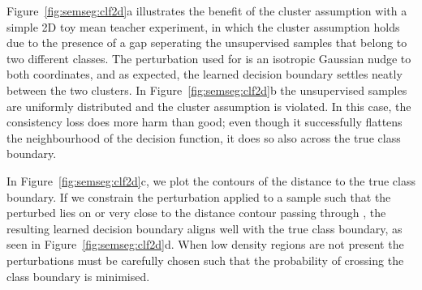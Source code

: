 \documentclass{bmvc2k}
\begin{document}
Figure~\ref{fig:semseg:clf2d}a illustrates the benefit of the cluster assumption with a simple 2D toy mean teacher experiment, in which the cluster assumption holds due to the presence of a gap seperating the unsupervised samples that belong to two different classes.
The perturbation used for  is an isotropic Gaussian nudge to both coordinates, and as expected, the learned decision boundary settles neatly between the two clusters.
In Figure~\ref{fig:semseg:clf2d}b the unsupervised samples are uniformly distributed and the cluster assumption is violated.
In this case, the consistency loss does more harm than good; even
though it successfully flattens the neighbourhood of the decision function, it does so also across the
true class boundary. 


In Figure~\ref{fig:semseg:clf2d}c, we plot the contours of the distance to the true class boundary.
If we constrain the perturbation applied to a sample  such that the perturbed  lies on or very close to the distance contour passing through ,
the resulting  learned decision boundary aligns well with the true class boundary, as seen in Figure~\ref{fig:semseg:clf2d}d.
When low density regions are not present the perturbations must be carefully chosen such that the probability of crossing
the class boundary is minimised.
\end{document}
